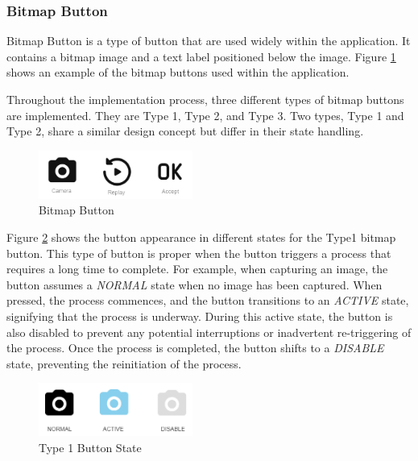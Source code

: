 \subsubsection{Bitmap Button}
Bitmap Button is a type of button that are used widely within the application. It contains a bitmap image and a text label positioned below the image. Figure \ref{fig:bitmap_button} shows an example of the bitmap buttons used within the application.

Throughout the implementation process, three different types of
bitmap buttons are implemented. They are Type 1, Type 2, and Type 3. Two types, Type 1 and Type 2, share a similar design concept but differ in their state handling.

\begin{figure}[!ht]
    \centering
    \includegraphics[width=0.45\textwidth]{texs/Part2/chapter4/image/bitmapbutton.png}
    \caption{Bitmap Button}
    \label{fig:bitmap_button}
\end{figure}

Figure \ref{fig:type1_state} shows the button appearance in different states for the Type1 bitmap button. This type of button is proper when the button triggers a process that requires a long time to complete. For example, when capturing an image, the button assumes a \textit{NORMAL} state when no image has been captured. When pressed, the process commences, and the button transitions to an \textit{ACTIVE} state, signifying that the process is underway. During this active state, the button is also disabled to prevent any potential interruptions or inadvertent re-triggering of the process. Once the process is completed, the button shifts to a \textit{DISABLE} state, preventing the reinitiation of the process.

\begin{figure}[!ht]
    \centering
    \includegraphics[width=0.45\textwidth]{texs/Part2/chapter4/image/type1state.png}
    \caption{Type 1 Button State}
    \label{fig:type1_state}
\end{figure}

